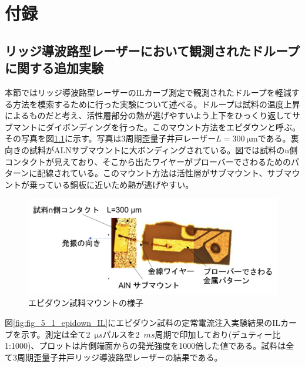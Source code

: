 
\chapter{付録}

\section{リッジ導波路型レーザーにおいて観測されたドループに関する追加実験}

本節ではリッジ導波路型レーザーのILカーブ測定で観測されたドループを軽減する方法を模索するために行った実験について述べる。ドループは試料の温度上昇によるものだと考え、活性層部分の熱が逃げやすいよう上下をひっくり返してサブマントにダイボンディングを行った。このマウント方法をエピダウンと呼ぶ。その写真を図\ref{fig:fig_5_1_epidown_mount}に示す。写真は3周期歪量子井戸レーザー$L=300\ \si{\micro\metre}$である。裏向きの試料がALNサブマウントに大ボンディングされている。図では試料のn側コンタクトが見えており、そこから出たワイヤーがプローバーでさわるためのパターンに配線されている。このマウント方法は活性層がサブマウント、サブマウントが乗っている銅板に近いため熱が逃げやすい。
\begin{figure}[h]
	\includegraphics[width=15cm]{figure/fig_5_1_epidown_mount.png}
	\caption{エピダウン試料マウントの様子}
	\label{fig:fig_5_1_epidown_mount}
\end{figure}


図\ref{fig:fig_5_1_epidown_IL}にエピダウン試料の定常電流注入実験結果のILカーブを示す。測定は全て2\ $\si{\micro s}$パルスを2\ $\si{m s}$周期で印加しており(デュティー比1:1000)、プロットは片側端面からの発光強度を1000倍した値である。試料は全て3周期歪量子井戸リッジ導波路型レーザーの結果である。

